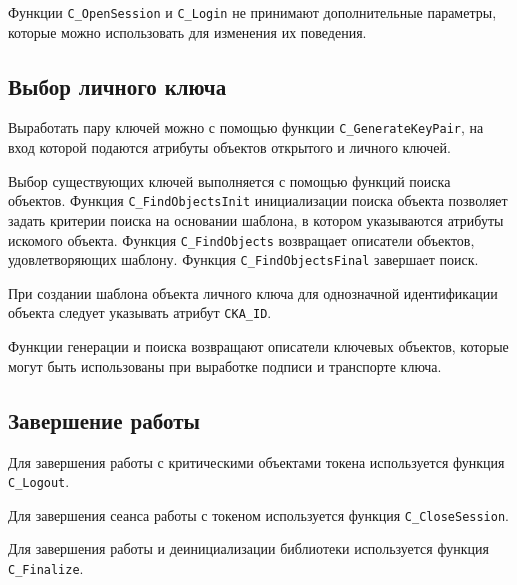 Функции \verb|C_OpenSession| и \verb|C_Login| не принимают
дополнительные параметры, которые можно использовать для
изменения их поведения.


\subsection{Выбор личного ключа}

Выработать пару ключей можно с помощью функции
\verb|C_GenerateKeyPair|, на вход которой подаются атрибуты
объектов открытого и личного ключей.

Выбор существующих ключей выполняется с помощью функций
поиска объектов. Функция \verb|C_FindObjectsInit| инициализации
поиска объекта позволяет задать критерии поиска на основании
шаблона, в котором указываются атрибуты искомого объекта.
Функция \verb|C_FindObjects| возвращает описатели объектов,
удовлетворяющих шаблону. Функция \verb|C_FindObjectsFinal|
завершает поиск.

При создании шаблона объекта личного ключа для однозначной
идентификации объекта следует указывать атрибут \verb|CKA_ID|.

Функции генерации и поиска возвращают описатели ключевых
объектов, которые могут быть использованы при выработке подписи
и транспорте ключа.



\subsection{Завершение работы}

Для завершения работы с критическими объектами токена
используется функция \verb|C_Logout|.

Для завершения сеанса работы с токеном используется функция
\verb|C_CloseSession|.

Для завершения работы и деинициализации библиотеки
используется функция \verb|C_Finalize|.
\fi
